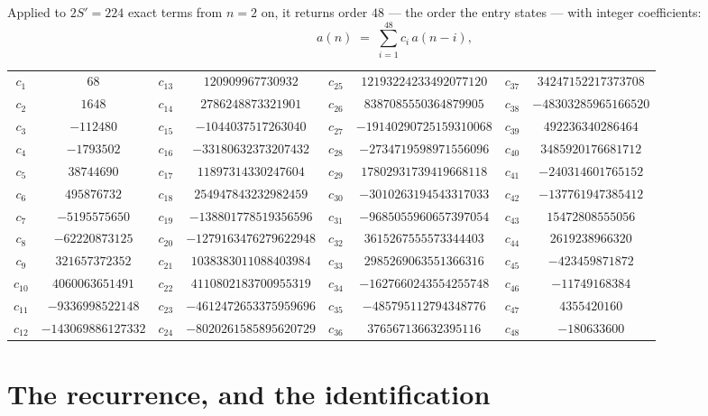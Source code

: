\documentclass[11pt,a4paper]{article}
\theoremstyle{plain}
\theoremstyle{definition}
\begin{document}
Applied to $2S'=224$ exact terms from $n=2$ on, it returns order $48$ --- the
order the entry states --- with integer coefficients:
\[
a(n)\;=\;\sum_{i=1}^{48}c_i\,a(n-i),
\]
\begin{center}\small
\begin{tabular}{cccccccc}
$c_{1}$ & $68$ & $c_{13}$ & $120909967730932$ & $c_{25}$ & $12193224233492077120$ & $c_{37}$ & $34247152217373708$ \\
$c_{2}$ & $1648$ & $c_{14}$ & $2786248873321901$ & $c_{26}$ & $8387085550364879905$ & $c_{38}$ & $-48303285965166520$ \\
$c_{3}$ & $-112480$ & $c_{15}$ & $-1044037517263040$ & $c_{27}$ & $-19140290725159310068$ & $c_{39}$ & $492236340286464$ \\
$c_{4}$ & $-1793502$ & $c_{16}$ & $-33180632373207432$ & $c_{28}$ & $-2734719598971556096$ & $c_{40}$ & $3485920176681712$ \\
$c_{5}$ & $38744690$ & $c_{17}$ & $11897314330247604$ & $c_{29}$ & $17802931739419668118$ & $c_{41}$ & $-240314601765152$ \\
$c_{6}$ & $495876732$ & $c_{18}$ & $254947843232982459$ & $c_{30}$ & $-3010263194543317033$ & $c_{42}$ & $-137761947385412$ \\
$c_{7}$ & $-5195575650$ & $c_{19}$ & $-138801778519356596$ & $c_{31}$ & $-9685055960657397054$ & $c_{43}$ & $15472808555056$ \\
$c_{8}$ & $-62220873125$ & $c_{20}$ & $-1279163476279622948$ & $c_{32}$ & $3615267555573344403$ & $c_{44}$ & $2619238966320$ \\
$c_{9}$ & $321657372352$ & $c_{21}$ & $1038383011088403984$ & $c_{33}$ & $2985269063551366316$ & $c_{45}$ & $-423459871872$ \\
$c_{10}$ & $4060063651491$ & $c_{22}$ & $4110802183700955319$ & $c_{34}$ & $-1627660243554255748$ & $c_{46}$ & $-11749168384$ \\
$c_{11}$ & $-9336998522148$ & $c_{23}$ & $-4612472653375959696$ & $c_{35}$ & $-485795112794348776$ & $c_{47}$ & $4355420160$ \\
$c_{12}$ & $-143069886127332$ & $c_{24}$ & $-8020261585895620729$ & $c_{36}$ & $376567136632395116$ & $c_{48}$ & $-180633600$ \\
\end{tabular}
\end{center}

\section{The recurrence, and the identification}
\end{document}
